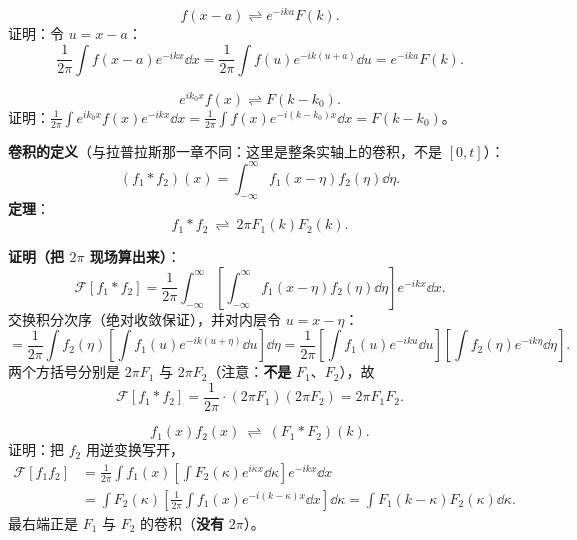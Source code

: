 \documentclass[11pt]{ctexart}
\begin{document}


\[ f(x-a)\rightleftharpoons e^{-ika}F(k) .\]
证明：令 $u=x-a$：
\[ \frac{1}{2\pi}\int f(x-a)e^{-ikx}\dd x=\frac{1}{2\pi}\int f(u)e^{-ik(u+a)}\dd u=e^{-ika}F(k) .\]


\[ e^{ik_0x}f(x)\rightleftharpoons F(k-k_0) .\]
证明：$\frac{1}{2\pi}\int e^{ik_0x}f(x)e^{-ikx}\dd x=\frac{1}{2\pi}\int f(x)e^{-i(k-k_0)x}\dd x=F(k-k_0)$。


\textbf{卷积的定义}（与拉普拉斯那一章不同：这里是整条实轴上的卷积，不是 $[0,t]$）：
\[ (f_1*f_2)(x)=\int_{-\infty}^{\infty}f_1(x-\eta)f_2(\eta)\dd\eta .\]
\textbf{定理}：
\[ f_1*f_2\ \rightleftharpoons\ 2\pi F_1(k)F_2(k) .\]

\textbf{证明（把 $2\pi$ 现场算出来）}：
\[
\mathcal{F}[f_1*f_2]=\frac{1}{2\pi}\int_{-\infty}^{\infty}\left[\int_{-\infty}^{\infty}f_1(x-\eta)f_2(\eta)\dd\eta\right]e^{-ikx}\dd x .
\]
交换积分次序（绝对收敛保证），并对内层令 $u=x-\eta$：
\[
=\frac{1}{2\pi}\int f_2(\eta)\left[\int f_1(u)e^{-ik(u+\eta)}\dd u\right]\dd\eta
=\frac{1}{2\pi}\left[\int f_1(u)e^{-iku}\dd u\right]\left[\int f_2(\eta)e^{-ik\eta}\dd\eta\right] .
\]
两个方括号分别是 $2\pi F_1$ 与 $2\pi F_2$（注意：\textbf{不是} $F_1$、$F_2$），故
\[
\mathcal{F}[f_1*f_2]=\frac{1}{2\pi}\cdot(2\pi F_1)(2\pi F_2)=2\pi F_1F_2 .
\]



\[ f_1(x)f_2(x)\ \rightleftharpoons\ (F_1*F_2)(k) .\]
证明：把 $f_2$ 用逆变换写开，
\[
\begin{aligned}
\mathcal{F}[f_1f_2]&=\frac{1}{2\pi}\int f_1(x)\left[\int F_2(\kappa)e^{i\kappa x}\dd\kappa\right]e^{-ikx}\dd x\\
&=\int F_2(\kappa)\left[\frac{1}{2\pi}\int f_1(x)e^{-i(k-\kappa)x}\dd x\right]\dd\kappa
=\int F_1(k-\kappa)F_2(\kappa)\dd\kappa .
\end{aligned}
\]
最右端正是 $F_1$ 与 $F_2$ 的卷积（\textbf{没有} $2\pi$）。
\end{document}
